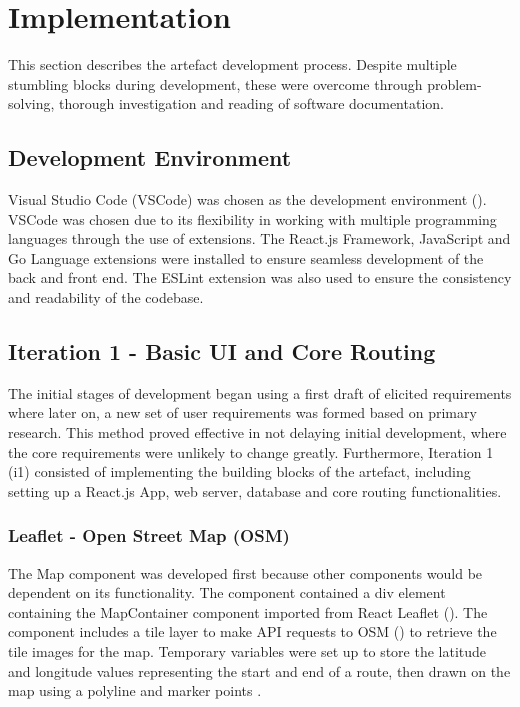 \chapter{Implementation}
\label{chap:implementation}

This section describes the artefact development process. Despite multiple stumbling blocks during development, these were overcome through problem-solving, thorough investigation and reading of software documentation.  

\section{Development Environment}
\label{implementation:de}

Visual Studio Code (VSCode) was chosen as the development environment (\cite{noauthor_visual_nodate}). VSCode was chosen due to its flexibility in working with multiple programming languages through the use of extensions. The React.js Framework, JavaScript and Go Language extensions were installed to ensure seamless development of the back and front end. The ESLint extension was also used to ensure the consistency and readability of the codebase.

\section{Iteration 1 - Basic UI and Core Routing}
\label{implementation:iteration1}
The initial stages of development began using a first draft of elicited requirements  where later on, a new set of user requirements was formed based on primary research. This method proved effective in not delaying initial development, where the core requirements were unlikely to change greatly. Furthermore, Iteration 1 (i1) consisted of implementing the building blocks of the artefact, including setting up a React.js App, web server, database and core routing functionalities.

\subsection{Leaflet - Open Street Map (OSM)}
\label{iteration1:leaflet-osm}
The Map component was developed first because other components would be dependent on its functionality. The component contained a div element containing the MapContainer component imported from React Leaflet (\cite{noauthor_react_nodate}). The component includes a tile layer to make API requests to OSM (\cite{noauthor_openstreetmap_nodate}) to retrieve the tile images for the map. Temporary variables were set up to store the latitude and longitude values representing the start and end of a route, then drawn on the map using a polyline and marker points . 


